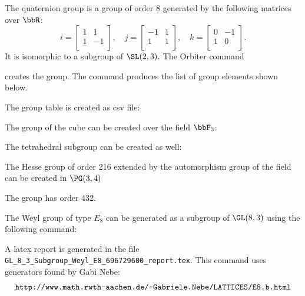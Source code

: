 The quaternion group is a group of order $8$ generated by 
the following matrices over $\bbR$:
$$
i = 
\left[
\begin{array}{rr}
1&1\\
1&-1\\
\end{array}
\right], \quad
j = 
\left[
\begin{array}{rr}
-1&1\\
1&1\\
\end{array}
\right], \quad
k = 
\left[
\begin{array}{rr}
0&-1\\
1&0\\
\end{array}
\right].
$$
It is isomorphic to a subgroup of $\SL(2,3).$
The Orbiter command
{\tt

}
creates the group. 
The command produces the list of group elements shown below.
\begin{mdframed}[style=MyFrame]

\end{mdframed}
The group table is created as csv file:
\begin{mdframed}[style=MyFrame]

\end{mdframed}


\bigskip

The group of the cube can be created over the field $\bbF_3$:
{\tt

}
The tetrahedral subgroup can be created as well:
{\tt

}
The Hesse group of order 216 extended by the automorphism group of the field 
can be created in $\PG(3,4)$
{\tt

}
{\tt

}
The group has order 432.

\bigskip



The Weyl group of type $E_8$ can be generated as a subgroup of $\GL(8,3)$ 
using the following command:
{\tt

}
{\tt

}
A latex report is generated in the file \verb'GL_8_3_Subgroup_Weyl_E8_696729600_report.tex'.
This command uses generators found by Gabi Nebe:
$$
\verb'http://www.math.rwth-aachen.de/~Gabriele.Nebe/LATTICES/E8.b.html'
$$


